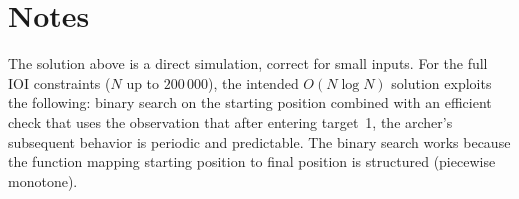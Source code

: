 \documentclass[11pt,a4paper]{article}
\begin{document}
\section{Notes}
The solution above is a direct simulation, correct for small inputs. For the full IOI constraints ($N$ up to $200\,000$), the intended $O(N \log N)$ solution exploits the following: binary search on the starting position combined with an efficient check that uses the observation that after entering target~1, the archer's subsequent behavior is periodic and predictable. The binary search works because the function mapping starting position to final position is structured (piecewise monotone).
\end{document}
